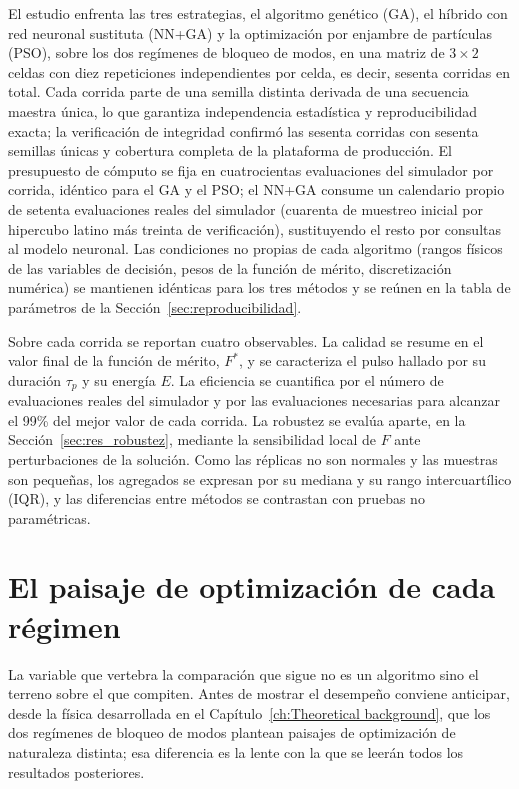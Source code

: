 El estudio enfrenta las tres estrategias, el algoritmo genético (GA), el híbrido con
red neuronal sustituta (NN+GA) y la optimización por enjambre de partículas (PSO),
sobre los dos regímenes de bloqueo de modos, en una matriz de $3\times2$ celdas con
diez repeticiones independientes por celda, es decir, sesenta corridas en total. Cada
corrida parte de una semilla distinta derivada de una secuencia maestra única, lo que
garantiza independencia estadística y reproducibilidad exacta; la verificación de
integridad confirmó las sesenta corridas con sesenta semillas únicas y cobertura
completa de la plataforma de producción. El presupuesto de cómputo se fija en
cuatrocientas evaluaciones del simulador por corrida, idéntico para el GA y el PSO;
el NN+GA consume un calendario propio de setenta evaluaciones reales del simulador
(cuarenta de muestreo inicial por hipercubo latino más treinta de verificación),
sustituyendo el resto por consultas al modelo neuronal. Las condiciones no propias de
cada algoritmo (rangos físicos de las variables de decisión, pesos de la función de
mérito, discretización numérica) se mantienen idénticas para los tres métodos y se
reúnen en la tabla de parámetros de la Sección~\ref{sec:reproducibilidad}.

Sobre cada corrida se reportan cuatro observables. La calidad se resume en el valor
final de la función de mérito, $F^\ast$, y se caracteriza el pulso hallado por su
duración $\tau_p$ y su energía $E$. La eficiencia se cuantifica por el número de
evaluaciones reales del simulador y por las evaluaciones necesarias para alcanzar el
99\% del mejor valor de cada corrida. La robustez se evalúa aparte, en
la Sección~\ref{sec:res_robustez}, mediante la sensibilidad local de $F$ ante
perturbaciones de la solución. Como las réplicas no son normales y las muestras son
pequeñas, los agregados se expresan por su mediana y su rango intercuartílico (IQR),
y las diferencias entre métodos se contrastan con pruebas no paramétricas.

\section{El paisaje de optimización de cada régimen}
\label{sec:res_paisaje}

La variable que vertebra la comparación que sigue no es un algoritmo sino el terreno
sobre el que compiten. Antes de mostrar el desempeño conviene anticipar, desde la física
desarrollada en el Capítulo~\ref{ch:Theoretical background}, que los dos regímenes de
bloqueo de modos plantean paisajes de optimización de naturaleza distinta; esa diferencia
es la lente con la que se leerán todos los resultados posteriores.

